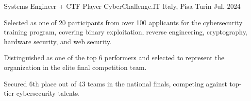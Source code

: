 

\begin{cventries}

  \cventry
    {Systems Engineer + CTF Player} %
    {CyberChallenge.IT} %
    {Italy, Pisa-Turin} %
    {Jul. 2024} %
    {
      \begin{cvitems} %
        \item {Selected as one of 20 participants from over 100 applicants for the cybersecurity training program, covering binary exploitation, reverse engineering, cryptography, hardware security, and web security.}
        \item {Distinguished as one of the top 6 performers and selected to represent the organization in the elite final competition team.}
        \item {Secured 6th place out of 43 teams in the national finals, competing against top-tier cybersecurity talents.}
      \end{cvitems}
    }

\end{cventries}
